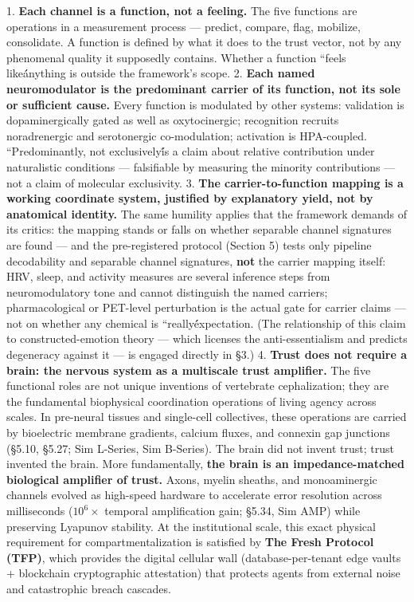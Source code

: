 \documentclass[11pt,twocolumn]{article}
\theoremstyle{plain}
\begin{document}
1. \textbf{Each channel is a function, not a feeling.} The five functions are operations in a measurement process — predict, compare, flag, mobilize, consolidate. A function is defined by what it does to the trust vector, not by any phenomenal quality it supposedly contains. Whether a function ``feels like\'\' anything is outside the framework's scope.
2. \textbf{Each named neuromodulator is the predominant carrier of its function, not its sole or sufficient cause.} Every function is modulated by other systems: validation is dopaminergically gated as well as oxytocinergic; recognition recruits noradrenergic and serotonergic co-modulation; activation is HPA-coupled. ``Predominantly, not exclusively\'\' is a claim about relative contribution under naturalistic conditions — falsifiable by measuring the minority contributions — not a claim of molecular exclusivity.
3. \textbf{The carrier-to-function mapping is a working coordinate system, justified by explanatory yield, not by anatomical identity.} The same humility applies that the framework demands of its critics: the mapping stands or falls on whether separable channel signatures are found --- and the pre-registered protocol (Section 5) tests only pipeline decodability and separable channel signatures, \textbf{not} the carrier mapping itself: HRV, sleep, and activity measures are several inference steps from neuromodulatory tone and cannot distinguish the named carriers; pharmacological or PET-level perturbation is the actual gate for carrier claims --- not on whether any chemical is ``really\'\' expectation. (The relationship of this claim to constructed-emotion theory — which licenses the anti-essentialism and predicts degeneracy against it — is engaged directly in \S{}3.)
4. \textbf{Trust does not require a brain: the nervous system as a multiscale trust amplifier.} The five functional roles are not unique inventions of vertebrate cephalization; they are the fundamental biophysical coordination operations of living agency across scales. In pre-neural tissues and single-cell collectives, these operations are carried by bioelectric membrane gradients, calcium fluxes, and connexin gap junctions (\S{}5.10, \S{}5.27; Sim L-Series, Sim B-Series). The brain did not invent trust; trust invented the brain. More fundamentally, \textbf{the brain is an impedance-matched biological amplifier of trust.} Axons, myelin sheaths, and monoaminergic channels evolved as high-speed hardware to accelerate error resolution across milliseconds ($10^6\times$ temporal amplification gain; \S{}5.34, Sim AMP) while preserving Lyapunov stability. At the institutional scale, this exact physical requirement for compartmentalization is satisfied by \textbf{The Fresh Protocol (TFP)}, which provides the digital cellular wall (database-per-tenant edge vaults + blockchain cryptographic attestation) that protects agents from external noise and catastrophic breach cascades.
\end{document}
